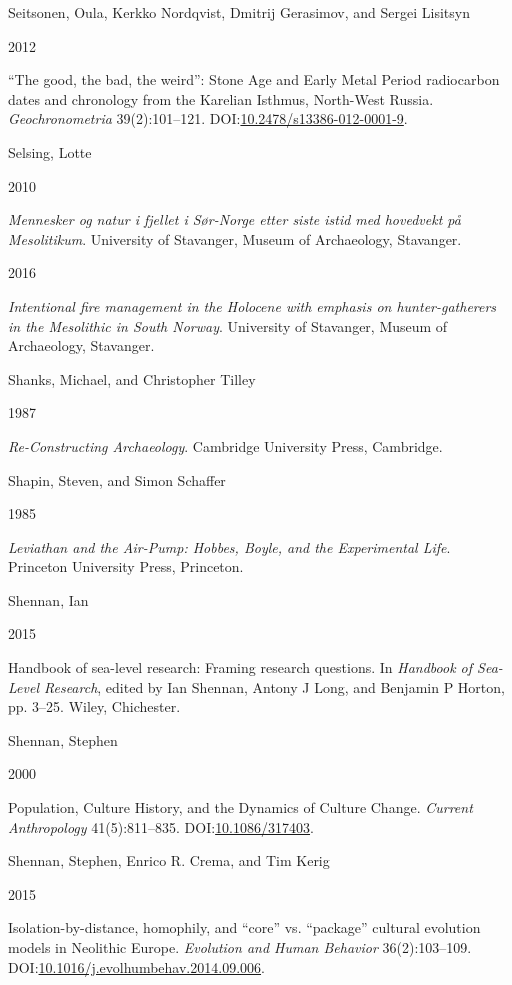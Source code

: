 \documentclass[
  12pt,
  a4paper,
  oneside]{book}
\newlength{\cslhangindent}
\newlength{\csllabelwidth}
\newlength{\cslentryspacingunit} %
\newenvironment{CSLReferences}[2] %
 {%
  \setlength{\parindent}{0pt}
  \ifodd #1
  \let\oldpar\par
  \def\par{\hangindent=\cslhangindent\oldpar}
  \fi
  \setlength{\parskip}{#2\cslentryspacingunit}
 }%
 {}
\newcommand{\CSLBlock}[1]{#1\hfill\break}
\newcommand{\CSLLeftMargin}[1]{\parbox[t]{\csllabelwidth}{#1}}
\newcommand{\CSLRightInline}[1]{\parbox[t]{\linewidth - \csllabelwidth}{#1}\break}
\begin{document}
\begin{CSLReferences}{0}{0}
\leavevmode{}%
\CSLBlock{Seitsonen, Oula, Kerkko Nordqvist, Dmitrij Gerasimov, and Sergei Lisitsyn}
\CSLLeftMargin{ 2012}%
\CSLRightInline{{{``The good, the bad, the weird''}: Stone Age and Early Metal Period radiocarbon dates and chronology from the Karelian Isthmus, North-West Russia}. \emph{Geochronometria} 39(2):101--121. DOI:\href{https://doi.org/10.2478/s13386-012-0001-9}{10.2478/s13386-012-0001-9}.}

\leavevmode{}%
\CSLBlock{Selsing, Lotte}
\CSLLeftMargin{ 2010}%
\CSLRightInline{\emph{{Mennesker og natur i fjellet i Sør-Norge etter siste istid med hovedvekt på Mesolitikum}}. University of Stavanger, Museum of Archaeology, Stavanger.}

\leavevmode{}%
\CSLLeftMargin{ 2016 }%
\CSLRightInline{\emph{{Intentional fire management in the Holocene with emphasis on hunter-gatherers in the Mesolithic in South Norway}}. University of Stavanger, Museum of Archaeology, Stavanger.}

\leavevmode{}%
\CSLBlock{Shanks, Michael, and Christopher Tilley}
\CSLLeftMargin{ 1987}%
\CSLRightInline{\emph{{Re-Constructing Archaeology}}. Cambridge University Press, Cambridge.}

\leavevmode{}%
\CSLBlock{Shapin, Steven, and Simon Schaffer}
\CSLLeftMargin{ 1985}%
\CSLRightInline{\emph{{Leviathan and the Air-Pump: Hobbes, Boyle, and the Experimental Life}}. Princeton University Press, Princeton.}

\leavevmode{}%
\CSLBlock{Shennan, Ian}
\CSLLeftMargin{ 2015}%
\CSLRightInline{Handbook of sea-level research: Framing research questions. In \emph{{Handbook of Sea-Level Research}}, edited by Ian Shennan, Antony J Long, and Benjamin P Horton, pp. 3--25. Wiley, Chichester.}

\leavevmode{}%
\CSLBlock{Shennan, Stephen}
\CSLLeftMargin{ 2000}%
\CSLRightInline{Population, Culture History, and the Dynamics of Culture Change. \emph{Current Anthropology} 41(5):811--835. DOI:\href{https://doi.org/10.1086/317403}{10.1086/317403}.}

\leavevmode{}%
\CSLBlock{Shennan, Stephen, Enrico R. Crema, and Tim Kerig}
\CSLLeftMargin{ 2015}%
\CSLRightInline{{Isolation-by-distance, homophily, and {``core''} vs. {``package''} cultural evolution models in Neolithic Europe}. \emph{Evolution and Human Behavior} 36(2):103--109. DOI:\href{https://doi.org/10.1016/j.evolhumbehav.2014.09.006}{10.1016/j.evolhumbehav.2014.09.006}.}


\end{CSLReferences}
\end{document}

